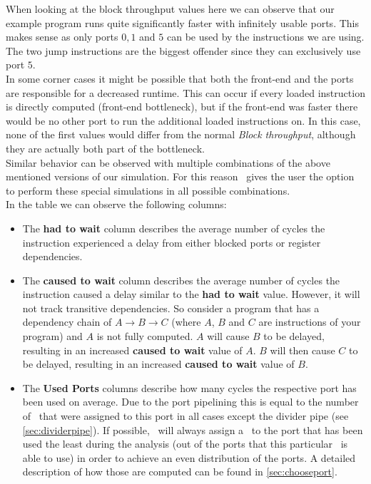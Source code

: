 When looking at the block throughput values here we can observe that our example program runs quite significantly faster with infinitely usable ports. This makes sense as only ports $0, 1$ and $5$ can be used by the instructions we are using. The two jump instructions are the biggest offender since they can exclusively use port $5$.\\

In some corner cases it might be possible that both the front-end and the ports are responsible for a decreased runtime. This can occur if every loaded instruction is directly computed (front-end bottleneck), but if the front-end was faster there would be no other port to run the additional loaded instructions on. In this case, none of the first values would differ from the normal \emph{Block throughput}, although they are actually both part of the bottleneck.\\
Similar behavior can be observed with multiple combinations of the above mentioned versions of our simulation. For this reason \suaca\ gives the user the option to perform these special simulations in all possible combinations.\\


In the table we can observe the following columns:
\begin{itemize}
    \item The \textbf{had to wait} column describes the average number of cycles the instruction experienced a delay from either blocked ports or register dependencies. 
    \item The \textbf{caused to wait} column describes the average number of cycles the instruction caused a delay similar to the \textbf{had to wait} value. However, it will not track transitive dependencies. So consider a program that has a dependency chain of $A \rightarrow B \rightarrow C$ (where $A$, $B$ and $C$ are instructions of your program) and $A$ is not fully computed. $A$ will cause $B$ to be delayed, resulting in an increased \textbf{caused to wait} value of $A$. $B$ will then cause $C$ to be delayed, resulting in an increased \textbf{caused to wait} value of $B$.
    \item The \textbf{Used Ports} columns describe how many cycles the respective port has been used on average. Due to the port pipelining this is equal to the number of \microops\ that were assigned to this port in all cases except the divider pipe (see \autoref{sec:dividerpipe}). If possible, \suaca\ will always assign a \microop\ to the port that has been used the least during the analysis (out of the ports that this particular \microop\ is able to use) in order to achieve an even distribution of the ports. A detailed description of how those are computed can be found in \autoref{sec:chooseport}.
\end{itemize}


